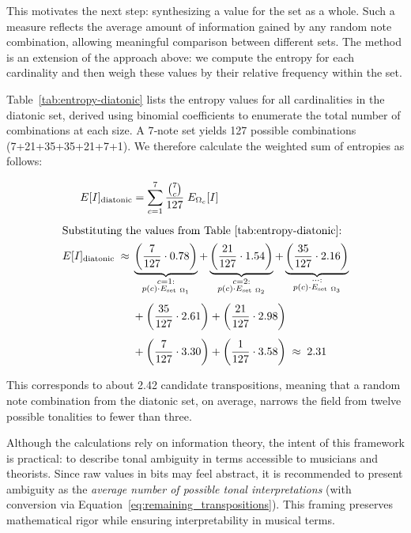 \documentclass[10pt,twocolumn]{article}
\numberwithin{equation}{section} %
\begin{document}
This motivates the next step: synthesizing a value for the
set as a whole. Such a measure reflects the average amount of information
gained by any random note combination, allowing meaningful comparison between
different sets. The method is an extension of the approach above: we compute
the entropy for each cardinality and then weigh these values by their relative
frequency within the set.

Table~\ref{tab:entropy-diatonic} lists the entropy values for all
cardinalities in the diatonic set, derived using binomial coefficients to
enumerate the total number of combinations at each size. A 7‑note set yields
127 possible combinations (7+21+35+35+21+7+1). We therefore calculate the
weighted sum of entropies as follows:

\begin{align}
E[I]_{\text{diatonic}} &= \sum_{c=1}^{7} \frac{\binom{7}{c}}{127} \; E_{\Omega_c}[I]
\label{eq:diatonic-avg} \\[4pt]
\intertext{Substituting the values from Table~\ref{tab:entropy-diatonic}:}
E[I]_{\text{diatonic}} \;\approx\; &
\underbrace{\left( \frac{7}{127} \cdot 0.78 \right)}_{\substack{c=1:\\ p(c)\cdot E_{\text{set}~\Omega_1}}} +
\underbrace{\left( \frac{21}{127} \cdot 1.54 \right)}_{\substack{c=2:\\ p(c)\cdot E_{\text{set}~\Omega_2}}} +
\underbrace{\left( \frac{35}{127} \cdot 2.16 \right)}_{\substack{\dots:\\ p(c)\cdot E_{\text{set}~\Omega_3}}}
\notag \\[4pt]
&+ \left( \frac{35}{127} \cdot 2.61 \right) +
\left( \frac{21}{127} \cdot 2.98 \right)
\notag \\[4pt]
&+ \left( \frac{7}{127} \cdot 3.30 \right) +
\left( \frac{1}{127} \cdot 3.58 \right)
\;\approx\; 2.31
\label{eq:diatonic-sub}
\end{align}



This corresponds to about 2.42 candidate transpositions,
meaning that a random note combination from the diatonic set, on average,
narrows the field from twelve possible tonalities to fewer than three.

Although the calculations rely on information theory, the
intent of this framework is practical: to describe tonal ambiguity in terms
accessible to musicians and theorists. Since raw values in bits may feel
abstract, it is recommended to present ambiguity as the \textit{average number of
possible tonal interpretations} (with conversion via Equation~\ref{eq:remaining_transpositions}). This
framing preserves mathematical rigor while ensuring interpretability in musical
terms.
\end{document}
